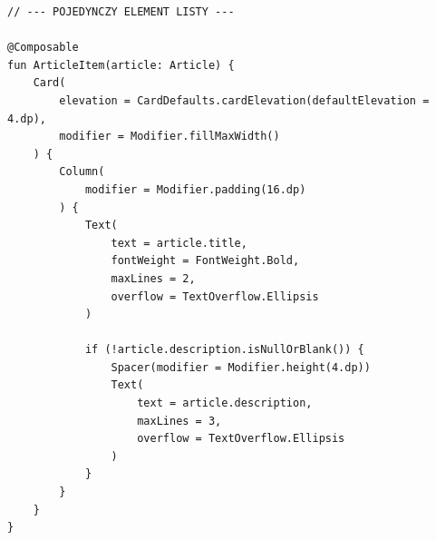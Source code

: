 \begin{verbatim}
// --- POJEDYNCZY ELEMENT LISTY ---

@Composable
fun ArticleItem(article: Article) {
    Card(
        elevation = CardDefaults.cardElevation(defaultElevation = 4.dp),
        modifier = Modifier.fillMaxWidth()
    ) {
        Column(
            modifier = Modifier.padding(16.dp)
        ) {
            Text(
                text = article.title,
                fontWeight = FontWeight.Bold,
                maxLines = 2,
                overflow = TextOverflow.Ellipsis
            )
            
            if (!article.description.isNullOrBlank()) {
                Spacer(modifier = Modifier.height(4.dp))
                Text(
                    text = article.description,
                    maxLines = 3,
                    overflow = TextOverflow.Ellipsis
                )
            }
        }
    }
}
\end{verbatim}
